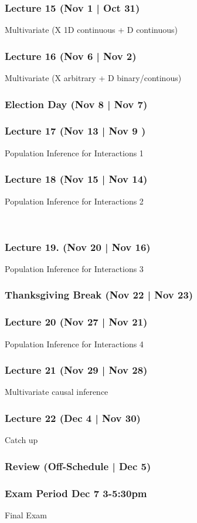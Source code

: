 \documentclass[12pt]{article}
\begin{document}
\subsubsection*{Lecture 15 (Nov 1 | Oct 31)}
Multivariate (X 1D continuous + D continuous)



\subsubsection*{Lecture 16 (Nov 6 | Nov 2)}
Multivariate (X arbitrary + D binary/continous)

 

\subsubsection*{Election Day (Nov 8 | Nov 7)}



\subsubsection*{Lecture 17 (Nov 13 | Nov 9 )}
Population Inference for Interactions 1


\subsubsection*{Lecture 18 (Nov 15 | Nov 14)}
Population Inference for Interactions 2

\ \ 

\subsubsection*{Lecture 19. (Nov 20 | Nov 16)}
Population Inference for Interactions 3



\subsubsection*{Thanksgiving Break (Nov 22 | Nov 23)}


\subsubsection*{Lecture 20 (Nov 27 | Nov 21)} 
Population Inference for Interactions 4


\subsubsection*{Lecture 21 (Nov 29 | Nov 28)}
Multivariate causal inference 



\subsubsection*{Lecture 22 (Dec 4 | Nov 30)}
Catch up 


\subsubsection*{Review (Off-Schedule | Dec 5)}


\subsubsection*{Exam Period Dec 7 3-5:30pm}
Final Exam		
		
\end{document}

